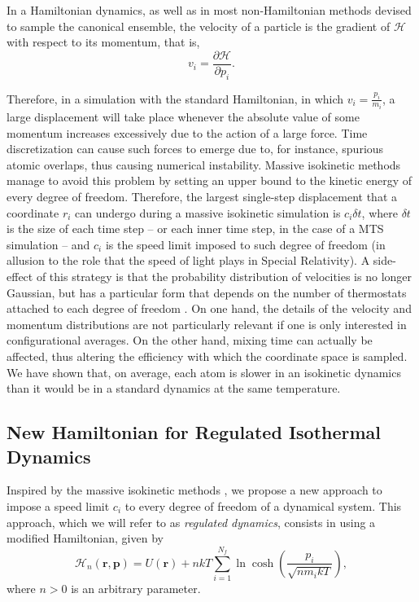 \documentclass[
aip,
jcp,
reprint,
]{revtex4-1}
\newcommand{\vt}[1]{\boldsymbol{\mathbf{#1}}}          %
\newcommand{\diff}[2]{\frac{\partial #2}{\partial #1}} %
\newcommand{\nn}{n}
\begin{document}
In a Hamiltonian dynamics, as well as in most non-Hamiltonian methods devised to sample the canonical ensemble, the velocity of a particle is the gradient of $\mathcal{H}$ with respect to its momentum, that is,
\begin{equation}
\label{eq:velocity as momentum gradient}
v_i = \diff{p_i}{{\mathcal H}}.
\end{equation}

Therefore, in a simulation with the standard Hamiltonian, in which $v_i = \frac{p_i}{m_i}$, a large displacement will take place whenever the absolute value of some momentum increases excessively due to the action of a large force.
Time discretization can cause such forces to emerge due to, for instance, spurious atomic overlaps, thus causing numerical instability.
Massive isokinetic methods \cite{Minary_2003a, Minary_2003b, Minary_2004, Leimkuhler_2013} manage to avoid this problem by setting an upper bound to the kinetic energy of every degree of freedom.
Therefore, the largest single-step displacement that a coordinate $r_i$ can undergo during a massive isokinetic simulation is $c_i \delta t$, where $\delta t$ is the size of each time step -- or each inner time step, in the case of a MTS simulation -- and $c_i$ is the speed limit imposed to such degree of freedom (in allusion to the role that the speed of light plays in Special Relativity).
A side-effect of this strategy is that the probability distribution of velocities is no longer Gaussian, but has a particular form that depends on the number of thermostats attached to each degree of freedom \cite{Abreu_2020}.
On one hand, the details of the velocity and momentum distributions are not particularly relevant if one is only interested in configurational averages.
On the other hand, mixing time can actually be affected, thus altering the efficiency with which the coordinate space is sampled.
We have shown \cite{Abreu_2020} that, on average, each atom is slower in an isokinetic dynamics than it would be in a standard dynamics at the same temperature.

\subsection{New Hamiltonian for Regulated Isothermal Dynamics}
\label{sec:new hamiltonian}

Inspired by the massive isokinetic methods \cite{Minary_2003a, Minary_2003b, Minary_2004, Leimkuhler_2013}, we propose a new approach to impose a speed limit $c_i$ to every degree of freedom of a dynamical system.
This approach, which we will refer to as \textit{regulated dynamics}, consists in using a modified Hamiltonian, given by
\begin{equation}
\label{eq:modified hamiltonian}
\mathcal{H}_\nn(\vt r, \vt p) = U(\vt r) + \nn kT \sum_{i=1}^{N_f} \ln \cosh\left(\frac{p_i}{\sqrt{\nn m_i k T}}\right),
\end{equation}
where $\nn > 0$ is an arbitrary parameter.
\end{document}

